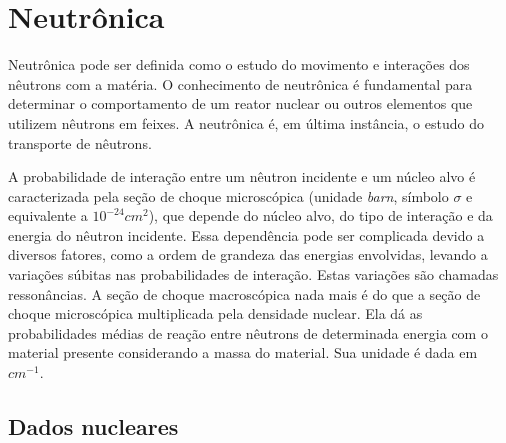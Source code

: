 


\section{Neutrônica}
\label{sec:neutronica}

Neutrônica pode ser definida como o estudo do movimento e interações dos nêutrons
com a matéria. O conhecimento de neutrônica é fundamental para determinar o
comportamento de um reator nuclear ou outros elementos que utilizem nêutrons
em feixes. A neutrônica é, em última instância, o estudo do transporte de nêutrons.

A probabilidade de interação entre um nêutron incidente e um núcleo alvo é caracterizada
pela seção de choque microscópica (unidade \textit{barn}, símbolo $\sigma$ e
equivalente a $10^{-24} cm^2$), que depende do núcleo alvo, do tipo de interação e da
energia do nêutron incidente. Essa dependência pode ser complicada devido a diversos fatores,
como a ordem de grandeza das energias envolvidas, levando a variações súbitas nas probabilidades
de interação. Estas variações são chamadas ressonâncias. A seção de choque macroscópica nada mais
é do que a seção de choque microscópica multiplicada pela densidade nuclear. Ela dá as probabilidades
médias de reação entre nêutrons de determinada energia com o material presente considerando a massa
do material. Sua unidade é dada em $cm^{-1}$.


\subsection{Dados nucleares}
\label{subsec:dn}

